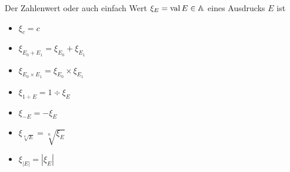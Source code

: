 \begin{definition}
Der Zahlenwert oder auch einfach 
Wert $\xi_E=\mathop{\rm val}\nolimits{E}\in\mathbb{A}$ eines Ausdrucks $E$ ist
\begin{itemize}
\item $\xi_{c            } = c$
\item $\xi_{E_0+      E_1} = \xi_{E_0} + \xi_{E_1}$
\item $\xi_{E_0\times E_1} = \xi_{E_0} \times \xi_{E_1}$
\item $\xi_{1  \div   E  } = 1 \div \xi_E$
\item $\xi_{-E           } = -\xi_{E}$
\item $\xi_{\sqrt[n]{E}  } = \sqrt[n]{\xi_E}$
\item $\xi_{|E|          } = |\xi_E|$
\end{itemize}
\end{definition}


